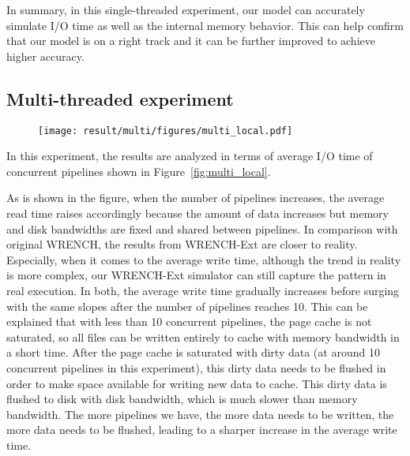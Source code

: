 \documentclass[conference]{IEEEtran}
\begin{document}
			In summary, in this single-threaded experiment, our model can accurately 
			simulate I/O time as well as the internal memory behavior. 
			This can help confirm that our model is on a right track and 
			it can be further improved to achieve higher accuracy.
			
		\subsection{Multi-threaded experiment}
		
			\begin{figure*}		
			\begin{subfigure}{\linewidth}
				\centering
   				\texttt{[image: result/multi/figures/multi\_local.pdf]}
			\end{subfigure}		
			\caption{I/O time of concurrent pipelines with local storage}
			\label{fig:multi_local}
			\end{figure*}		
			
			In this experiment, the results are analyzed in terms of average I/O time 
			of concurrent pipelines shown in Figure~\ref{fig:multi_local}.
			
			As is shown in the figure, when the number of pipelines increases, 
			the average read time raises accordingly because the amount of data 
			increases but memory and disk bandwidths are fixed and shared between pipelines. 
			In comparison with original WRENCH, the results from WRENCH-Ext are closer 
			to reality. 
			Especially, when it comes to the average write time, 
			although the trend in reality is more complex, our WRENCH-Ext 
			simulator can still capture the pattern in real execution.
			In both, the average write time gradually increases before surging with the 
			same slopes after the number of pipelines reaches 10. 
			This can be explained that with less than 10 concurrent pipelines, 
			the page cache is not saturated, so all files can be written entirely to 
			cache with memory bandwidth in a short time. 
			After the page cache is saturated with dirty data (at around 
			10 concurrent pipelines in this experiment), this dirty data needs 
			to be flushed in order to make space available for writing new data to cache. 
			This dirty data is flushed to disk with disk bandwidth, which is much  
			slower than memory bandwidth. 
			The more pipelines we have, the more data needs to be written, the more data 
			needs to be flushed, leading to a sharper increase in the average write time. 
			
\end{document}
